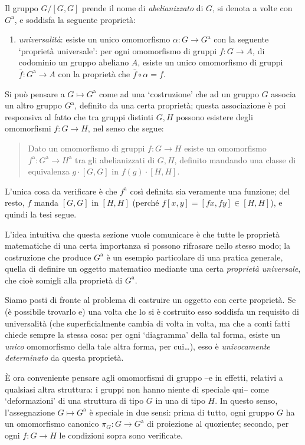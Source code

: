Il gruppo $G/[G,G]$ prende il nome di \emph{abelianizzato} di $G$, si denota a volte con $G^\text{a}$, e soddisfa la seguente proprietà:
\begin{enumerate}
  \item \emph{universalità}: esiste un unico omomorfismo $\alpha : G \to G^\text{a}$ con la seguente `proprietà universale': per ogni omomorfismo di gruppi $f : G \to A$, di codominio un gruppo abeliano $A$, esiste un unico omomorfismo di gruppi $\bar f : G^\text{a} \to A$ con la proprietà che $\bar f \circ \alpha = f$.
\end{enumerate}
\begin{remark}
Si può pensare a $G\mapsto G^\text{a}$ come ad una `costruzione' che ad un gruppo $G$ associa un altro gruppo $G^\text{a}$, definito da una certa proprietà; questa associazione è poi responsiva al fatto che tra gruppi distinti $G,H$ possono esistere degli omomorfismi $f : G \to H$, nel senso che segue:
\begin{quote}
Dato un omomorfismo di gruppi $f : G \to H$ esiste un omomorfismo $f^\text{a} : G^\text{a} \to H^\text{a}$ tra gli abelianizzati di $G,H$, definito mandando una classe di equivalenza $g\cdot [G,G]$ in $f(g)\cdot [H,H]$.
\end{quote}
L'unica cosa da verificare è che $f^\text{a}$ così definita sia veramente una funzione; del resto, $f$ manda $[G,G]$ in $[H,H]$ (perché $f[x,y]=[fx, fy]\in [H,H]$), e quindi la tesi segue.
\end{remark}
\begin{remark}
  L'idea intuitiva che questa sezione vuole comunicare è che tutte le proprietà matematiche di una certa importanza si possono rifrasare nello stesso modo; la costruzione che produce $G^\text{a}$ è un esempio particolare di una pratica generale, quella di definire un oggetto matematico mediante una certa \emph{proprietà universale}, che cioè somigli alla proprietà di $G^\text{a}$.

  Siamo posti di fronte al problema di costruire un oggetto con certe proprietà. Se (è possibile trovarlo e) una volta che lo si è costruito esso soddisfa un requisito di universalità (che superficialmente cambia di volta in volta, ma che a conti fatti chiede sempre la stessa cosa: per ogni `diagramma' della tal forma, esiste un \emph{unico} omomorfismo della tale altra forma, per cui\dots), esso è \emph{univocamente determinato} da questa proprietà.
\end{remark}
\`E ora conveniente pensare agli omomorfismi di gruppo --e in effetti, relativi a qualsiasi altra struttura: i gruppi non hanno niente di speciale qui-- come `deformazioni' di una struttura di tipo $G$ in una di tipo $H$. In questo senso, l'assegnazione $G\mapsto G^\text{a}$ è speciale in due sensi: prima di tutto, ogni gruppo $G$ ha un omomorfismo canonico $\pi_G : G \to G^\text{a}$ di proiezione al quoziente; secondo, per ogni $f : G \to H$ le condizioni sopra sono verificate.
